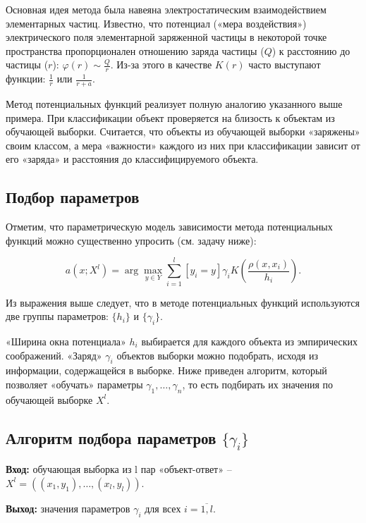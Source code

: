 Основная идея метода была навеяна электростатическим взаимодействием элементарных частиц. Известно, что потенциал («мера воздействия») электрического поля элементарной заряженной частицы в некоторой точке пространства пропорционален отношению заряда частицы ($Q$) к расстоянию до частицы ($r$): $\varphi(r) \sim \frac{Q}{r}$. Из-за этого в качестве $K(r)$ часто выступают функции: $\frac{1}{r}$ или $\frac{1}{r+a}$.

Метод потенциальных функций реализует полную аналогию указанного выше примера. При классификации объект проверяется на близость к объектам из обучающей выборки. Считается, что объекты из обучающей выборки «заряжены» своим классом, а мера «важности» каждого из них при классификации зависит от его «заряда» и расстояния до классифицируемого объекта.

\subsection{Подбор параметров}

Отметим, что параметрическую модель зависимости метода потенциальных функций можно существенно упросить (см. задачу ниже):

\begin{equation*}
	\displaystyle a(x; X^l) = \arg\max_{y\in Y} \sum\limits_{i=1}^l[y_i=y]\gamma_i K\left(\frac{\rho(x, x_i)}{h_i}\right).
\end{equation*}

Из выражения выше следует, что в методе потенциальных функций используются две группы параметров: $\{h_i\}$ и $\{\gamma_i\}$.

«Ширина окна потенциала» $h_i$ выбирается для каждого объекта из эмпирических соображений. «Заряд» $\gamma_i$ объектов выборки можно подобрать, исходя из информации, содержащейся в выборке. Ниже приведен алгоритм, который позволяет «обучать» параметры $\gamma_1, \dots, \gamma_n$, то есть подбирать их значения по обучающей выборке $X^l$.

\subsection*{Алгоритм подбора параметров $\{\gamma_i\}$}

\noindent \textbf{Вход:} обучающая выборка из l пар «объект-ответ» -- $X^l=\left((x_1,y_1), \dots, (x_l,y_l) \right)$.

\noindent \textbf{Выход:} значения параметров $\gamma_i$ для всех $i=\overline{1,l}$.

